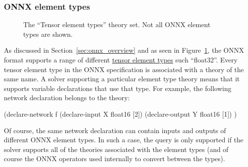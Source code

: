 \subsubsection{ONNX element types}

\begin{figure}[h]
\centering
{}
\caption{The ``Tensor element types'' theory set. Not all ONNX element types are shown.}
\label{fig:element-type-theories}
\end{figure}

As discussed in Section~\ref{sec:onnx_overview} and as seen in Figure~\ref{fig:element-type-theories}, the ONNX format supports a range of different \href{https://onnx.ai/onnx/repo-docs/IR.html#tensor-element-types}{tensor element types} such ``float32''. Every tensor element type in the ONNX specification is associated with a \vnnlib{} theory of the same name. A solver supporting a particular element type theory means that it supports variable declarations that use that type. For example, the following network declaration belongs to the  theory:

\begin{code}[style=lbnf]
(declare-network f
    (declare-input  X float16 [2])
    (declare-output Y float16 [1])
)
\end{code}

Of course, the same network declaration can contain inputs and outputs of different ONNX element types. In such a case, the query is only supported if the solver supports all of the theories associated with the element types (and of course the ONNX operators used internally to convert between the types).

